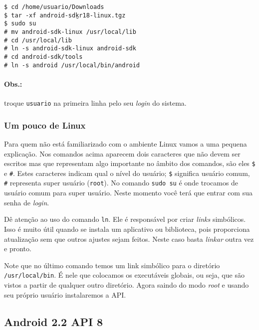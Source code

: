 \begin{flushleft}
\texttt{\$ cd /home/usuario/Downloads \\
\$ tar -xf android-sdk\b{ }r18-linux.tgz \\
\$ sudo su \\
\# mv android-sdk-linux /usr/local/lib \\
\# cd /usr/local/lib \\
\# ln -s android-sdk-linux android-sdk \\
\# cd android-sdk/tools \\
\# ln -s android /usr/local/bin/android \\
}
\end{flushleft}

\paragraph{Obs.:} troque \texttt{usuario} na primeira linha pelo seu \textit{login} do sistema.

\subsubsection{Um pouco de Linux}

Para quem não está familiarizado com o ambiente Linux vamos a uma pequena explicação. Nos comandos
acima aparecem dois caracteres que não devem ser escritos mas que representam algo importante no âmbito
dos comandos, são eles \texttt{\$} e \texttt{\#}. Estes caracteres indicam qual o nível do usuário;
\texttt{\$} significa usuário comum, \texttt{\#} representa super usuário (\texttt{root}). No comando
\texttt{sudo su} é onde trocamos de usuário comum para super usuário. Neste momento você terá que entrar
com sua senha de \textit{login}.

Dê atenção ao uso do comando \texttt{ln}. Ele é responsável por criar \textit{links} simbólicos. Isso é
muito útil quando se instala um aplicativo ou biblioteca, pois proporciona atualização sem que
outros ajustes sejam feitos. Neste caso basta \textit{linkar} outra vez e pronto.

Note que no último comando temos um link simbólico para o diretório \texttt{/usr/local/bin}. É
nele que colocamos os executáveis globais, ou seja, que são vistos a partir de qualquer outro
diretório. Agora saindo do modo \textit{root} e usando seu próprio usuário instalaremos a API.

\subsection{Android 2.2 API 8}

